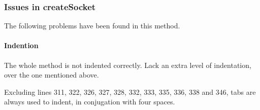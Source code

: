 
\subsubsection{Issues in createSocket}
The following problems have been found in this method.


\paragraph{Indention}
\begin{itemize}
	\begin{itemize}
			The whole method is not indented correctly.
			Lack an extra level of indentation, over the one mentioned above.
	\end{itemize}
		Excluding lines 311, 322, 326, 327, 328, 332, 333, 335, 336, 338 and 346, tabs are always used to indent, in conjugation with four spaces.
\end{itemize}

